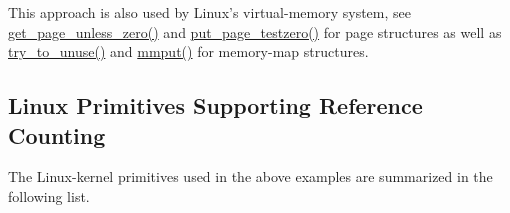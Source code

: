 This approach is also used by Linux's virtual-memory system,
see \url{get_page_unless_zero()} and \url{put_page_testzero()} for
page structures as well as \url{try_to_unuse()} and \url{mmput()}
for memory-map structures.

\subsection{Linux Primitives Supporting Reference Counting}
\label{sec:defer:Linux Primitives Supporting Reference Counting}

The Linux-kernel primitives used in the above examples are
summarized in the following list.

